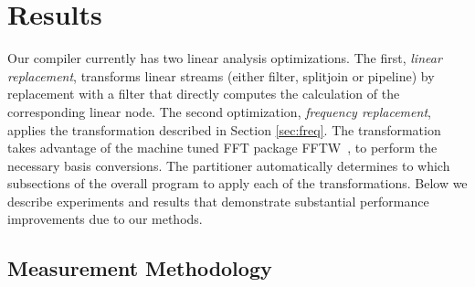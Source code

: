\section{Results}
\label{sec:results}

Our compiler currently has two linear analysis optimizations. The
first, {\it linear replacement}, transforms linear streams (either
filter, splitjoin or pipeline) by replacement with a filter that
directly computes the calculation of the corresponding linear node.
The second optimization, {\it frequency replacement}, applies the
transformation described in Section \ref{sec:freq}.  The
transformation takes advantage of the machine tuned FFT package
FFTW~\cite{frigo99fast}, to perform the necessary basis conversions.
The partitioner automatically determines to which subsections of the
overall program to apply each of the transformations. Below we
describe experiments and results that demonstrate substantial
performance improvements due to our methods.

\subsection{Measurement Methodology}


